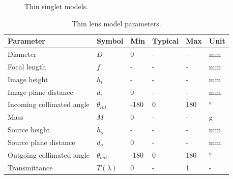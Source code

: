 \begin{figure}[H]
    \centering
    \qquad
    \caption{Thin singlet models.}
    \label{fig:thin-singlet-lens-models}
\end{figure}

\begin{table}[H]
\centering
\caption{Thin lens model parameters.}
\label{tab:thin-lens-parameters}
\begin{tabular}{@{}llllll@{}}
\toprule
Parameter                 & Symbol           & Min  & Typical & Max & Unit           \\ \midrule
Diameter                  & {$D$}            & 0    & -       & -   & {\si{\mm}}     \\
Focal length              & {$f$}            & -    & -       & -   & {\si{\mm}}     \\
Image height              & {$h_i$}          & -    & -       & -   & {\si{\mm}}     \\
Image plane distance      & {$d_i$}          & 0    & -       & -   & {\si{\mm}}     \\
Incoming collimated angle & {$\theta_{int}$} & -180 & 0       & 180 & {\si{\degree}} \\
Mass                      & {$M$}            & 0    & -       & -   & {\si{\g}}      \\
Source height             & {$h_o$}          & -    & -       & -   & {\si{\mm}}     \\
Source plane distance     & {$d_o$}          & 0    & -       & -   & {\si{\mm}}     \\
Outgoing collimated angle & {$\theta_{out}$} & -180 & 0       & 180 & {\si{\degree}} \\
Transmittance             & {$T(\lambda)$}   & 0    & -       & 1   & -              \\ \bottomrule
\end{tabular}
\end{table}


